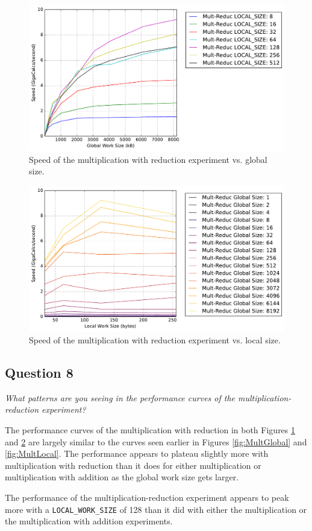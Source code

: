 \documentclass{article}
\begin{document}
\begin{figure}[h]
	\centering
        \includegraphics[width=0.7\linewidth]{Mult_Reduc_Arraysize_2.pdf}
        \caption{Speed of the multiplication with reduction experiment vs. global size.}
        \label{fig:ReducGlobal}
\end{figure}

\begin{figure}[h]
	\centering
        \includegraphics[width=0.7\linewidth]{Mult_Reduc_Localsize_2.pdf}
        \caption{Speed of the multiplication with reduction experiment vs. local size.}
        \label{fig:ReducLocal}
\end{figure}

\subsection*{Question 8}
\textit{What patterns are you seeing in the performance curves of the multiplication-reduction experiment?}

The performance curves of the multiplication with reduction in both Figures \ref{fig:ReducGlobal} and \ref{fig:ReducLocal} are largely similar to the curves seen earlier in Figures \ref{fig:MultGlobal} and \ref{fig:MultLocal}.  The performance appears to plateau slightly more with multiplication with reduction than it does for either multiplication or multiplication with addition as the global work size gets larger.

The performance of the multiplication-reduction experiment appears to peak more with a \texttt{LOCAL\_WORK\_SIZE} of 128 than it did with either the multiplication or the multiplication with addition experiments.
\end{document}
